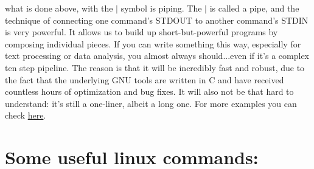 \documentclass[12pt]{article}
\begin{document}
what is done above, with the $\mid$ symbol is piping. The $\mid$  is called a pipe,
and the technique of connecting one command's STDOUT to another command's STDIN is
very powerful. It allows us to build up short-but-powerful programs by composing individual
pieces. If you can write something this way, especially for text processing or data analysis,
you almost always should...even if it's a complex ten step pipeline. The reason is that it will
be incredibly fast and robust, due to the fact that the underlying GNU tools are written in C
and have received countless hours of optimization and bug fixes. It will also not be that hard
to understand: it's still a one-liner, albeit a long one. For more examples you can check \href{http://www.westwind.com/reference/os-x/commandline/pipes.html}{here}.



\newpage	
\section{Some useful linux commands:}
 
\end{document}
